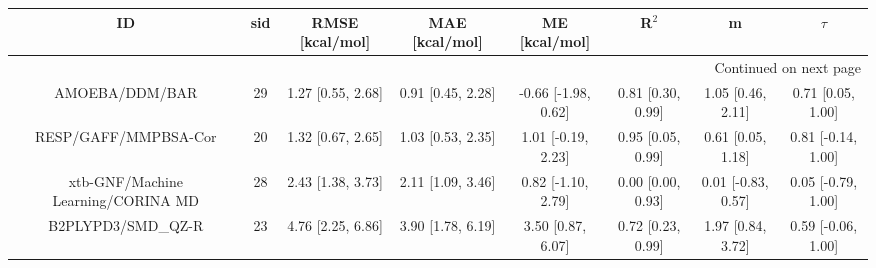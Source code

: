 \documentclass[8pt]{article}
\begin{document}
\begin{center}
\begin{footnotesize}
\begin{longtable}{|cccccccc|}
\toprule
                                 ID & sid &    RMSE [kcal/mol] &     MAE [kcal/mol] &        ME [kcal/mol] &              R$^2$ &                   m &              $\tau$ \\
\midrule
\endhead
\midrule
\multicolumn{8}{r}{{Continued on next page}} \\
\midrule
\endfoot

\bottomrule
\endlastfoot
                     AMOEBA/DDM/BAR &  29 &  1.27 [0.55, 2.68] &  0.91 [0.45, 2.28] &  -0.66 [-1.98, 0.62] &  0.81 [0.30, 0.99] &   1.05 [0.46, 2.11] &   0.71 [0.05, 1.00] \\
               RESP/GAFF/MMPBSA-Cor &  20 &  1.32 [0.67, 2.65] &  1.03 [0.53, 2.35] &   1.01 [-0.19, 2.23] &  0.95 [0.05, 0.99] &   0.61 [0.05, 1.18] &  0.81 [-0.14, 1.00] \\
 xtb-GNF/Machine Learning/CORINA MD &  28 &  2.43 [1.38, 3.73] &  2.11 [1.09, 3.46] &   0.82 [-1.10, 2.79] &  0.00 [0.00, 0.93] &  0.01 [-0.83, 0.57] &  0.05 [-0.79, 1.00] \\
                 B2PLYPD3/SMD\_QZ-R &  23 &  4.76 [2.25, 6.86] &  3.90 [1.78, 6.19] &    3.50 [0.87, 6.07] &  0.72 [0.23, 0.99] &   1.97 [0.84, 3.72] &  0.59 [-0.06, 1.00] \\
\end{longtable}
\end{footnotesize}
\end{center}
\end{document}
